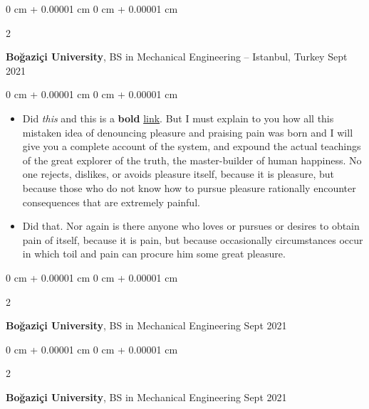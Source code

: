 \documentclass[10pt, letterpaper]{article}
\newenvironment{highlights}{
    \begin{itemize}[
        topsep=0.10 cm,
        parsep=0.10 cm,
        partopsep=0pt,
        itemsep=0pt,
        leftmargin=0 cm + 10pt
    ]
}{
    \end{itemize}
} %
\newenvironment{onecolentry}{
    \begin{adjustwidth}{
        0 cm + 0.00001 cm
    }{
        0 cm + 0.00001 cm
    }
}{
    \end{adjustwidth}
} %
\newenvironment{twocolentry}[2][]{
    \onecolentry
    \def\secondColumn{#2}
    \setcolumnwidth{\fill, 4.5 cm}
    \begin{paracol}{2}
}{
    \switchcolumn \raggedleft \secondColumn
    \end{paracol}
    \endonecolentry
} %
\begin{document}
        \begin{twocolentry}{
            Sept 2021
        }
            \textbf{Boğaziçi University}, BS in Mechanical Engineering -- Istanbul, Turkey\end{twocolentry}

        \vspace{0.10 cm}
        \begin{onecolentry}
            \begin{highlights}
                \item Did \textit{this} and this is a \textbf{bold} \href{https://example.com}{link}. But I must explain to you how all this mistaken idea of denouncing pleasure and praising pain was born and I will give you a complete account of the system, and expound the actual teachings of the great explorer of the truth, the master-builder of human happiness. No one rejects, dislikes, or avoids pleasure itself, because it is pleasure, but because those who do not know how to pursue pleasure rationally encounter consequences that are extremely painful.
                \item Did that. Nor again is there anyone who loves or pursues or desires to obtain pain of itself, because it is pain, but because occasionally circumstances occur in which toil and pain can procure him some great pleasure.
            \end{highlights}
        \end{onecolentry}


        \vspace{0.2 cm}

        \begin{twocolentry}{
            Sept 2021
        }
            \textbf{Boğaziçi University}, BS in Mechanical Engineering\end{twocolentry}



        \vspace{0.2 cm}

        \begin{twocolentry}{
            Sept 2021
        }
            \textbf{Boğaziçi University}, BS in Mechanical Engineering\end{twocolentry}
\end{document}
